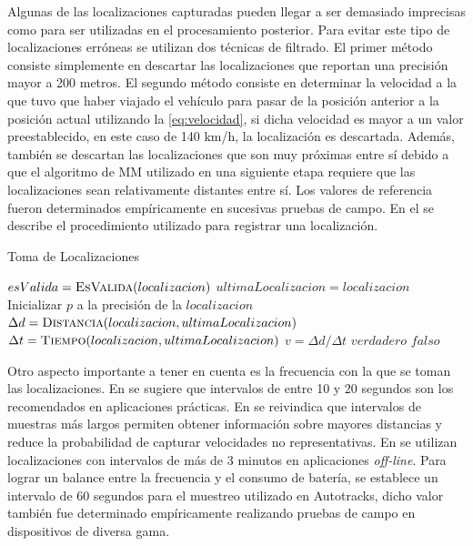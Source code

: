 Algunas de las localizaciones capturadas pueden llegar a ser demasiado imprecisas como para ser utilizadas en el procesamiento posterior. Para evitar este tipo de localizaciones erróneas se utilizan dos técnicas de filtrado. El primer método consiste simplemente en descartar las localizaciones que reportan una precisión mayor a 200 metros. El segundo método consiste en determinar la velocidad a la que tuvo que haber viajado el vehículo para pasar de la posición anterior a la posición actual utilizando la \cref{eq:velocidad}, si dicha velocidad es mayor a un valor preestablecido, en este caso de 140 km/h, la localización es descartada. Además, también se descartan las localizaciones que son muy próximas entre sí debido a que el algoritmo de MM utilizado en una siguiente etapa requiere que las localizaciones sean relativamente distantes entre sí. Los valores de referencia fueron determinados empíricamente en sucesivas pruebas de campo. En el  se describe el procedimiento utilizado para registrar una localización.

\begin{algorithm}
	\caption{Toma de Localizaciones}
	\label{alg:toma_de_localizaciones}
	\begin{algorithmic}[1]
		\State $esValida = \Call{EsValida}{localizacion}$
		\State $ultimaLocalizacion = localizacion$
		\EndIf
		\EndProcedure
		\Statex
		\State Inicializar $p$ a la precisión de la $localizacion$	
		\State $\Delta d = \Call{Distancia}{localizacion, ultimaLocalizacion}$
		\State $\Delta t = \Call{Tiempo}{localizacion, ultimaLocalizacion}$
		\State $v = \Delta d / \Delta t$
		\State \Return $verdadero$
		\Else
		\State \Return $falso$
		\EndIf
		\EndFunction
	\end{algorithmic}
\end{algorithm}

Otro aspecto importante a tener en cuenta es la frecuencia con la que se toman las localizaciones. En \cite{tao2012real} se sugiere que intervalos de entre 10 y 20 segundos son los recomendados en aplicaciones prácticas. En \cite{fontaine2005part} se reivindica que intervalos de muestras más largos permiten obtener información sobre mayores distancias y reduce la probabilidad de capturar velocidades no representativas. En \cite{lou2009map,giovannini2011novel} se utilizan localizaciones con intervalos de más de 3 minutos en aplicaciones \emph{off-line}. Para lograr un balance entre la frecuencia y el consumo de batería, se establece un intervalo de 60 segundos para el muestreo utilizado en Autotracks, dicho valor también fue determinado empíricamente realizando pruebas de campo en dispositivos de diversa gama.

